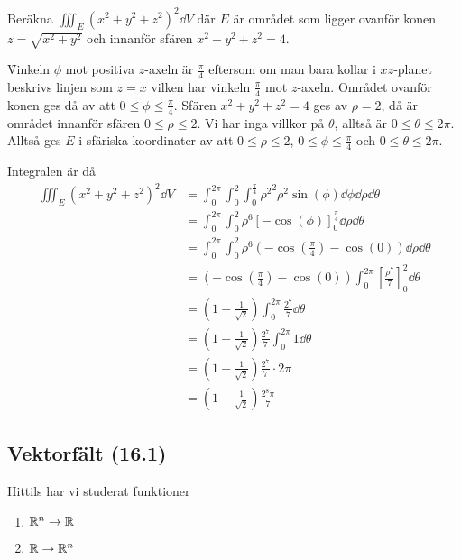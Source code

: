 \documentclass[a4paper]{article}
\begin{document}
\begin{ex}
    Beräkna \(
        \iiint_E {(x^2+y^2+z^2)}^2 \dd V
    \) där \(
        E
    \) är området som ligger ovanför konen \(
        z = \sqrt{x^2+y^2}
    \) och innanför sfären \(
        x^2+y^2+z^2 = 4
    \).

    \f

    Vinkeln \(
        \phi
    \) mot positiva \(
        z
    \)-axeln är \(
        \frac{\pi}{4} 
    \) eftersom om man bara kollar i \(
        xz
    \)-planet beskrivs linjen som \(
        z = x
    \) vilken har vinkeln \(
        \frac{\pi}{4} 
    \) mot \(
        z
    \)-axeln. Området ovanför konen ges då av att \(
        0 \leq \phi \leq \frac{\pi}{4} 
    \). Sfären \(
        x^2+y^2+z^2 = 4
    \) ges av \(
        \rho = 2
    \), då är området innanför sfären \(
        0 \leq \rho \leq 2
    \). Vi har inga villkor på \(
        \theta
    \), alltså är \(
        0 \leq \theta \leq 2\pi
    \). Alltså ges \(
        E
    \) i sfäriska koordinater av att \(
        0 \leq \rho \leq 2
    \), \(
        0 \leq \phi \leq \frac{\pi}{4} 
    \) och \(
        0 \leq \theta \leq 2\pi
    \). 

    Integralen är då 
    \begin{align*}
        \iiint_E {(x^2+y^2+z^2)}^2 \dd V &= \int_0^{2\pi} \int_0^2 \int_0^{\frac{\pi}{4}} {\rho^2}^2 \rho^2 \sin(\phi) \dd \phi \dd \rho \dd \theta \\
            &= \int_0^{2\pi} \int_0^2 \rho^6 \left[ -\cos(\phi) \right]_0^{\frac{\pi}{4}}  \dd \rho \dd \theta \\
            &= \int_0^{2\pi} \int_0^2 \rho^6 (- \cos(\frac{\pi}{4}) - \cos(0)) \dd \rho \dd \theta \\
            &= (- \cos(\frac{\pi}{4}) - \cos(0)) \int_0^{2\pi} \left[ \frac{\rho^7}{7} \right]_0^2 \dd \theta \\
            &= (1 - \frac{1}{\sqrt{2}} ) \int_0^{2\pi} \frac{2^7}{7}  \dd \theta \\
            &= (1 - \frac{1}{\sqrt{2}} )  \frac{2^7}{7} \int_0^{2\pi} 1 \dd \theta \\
            &= (1 - \frac{1}{\sqrt{2}} )  \frac{2^7}{7} \cdot 2\pi \\
            &= (1 - \frac{1}{\sqrt{2}} ) \frac{2^8 \pi}{7} 
    \end{align*}
\end{ex}

\subsection{Vektorfält (16.1)}
Hittils har vi studerat funktioner 
\begin{enumerate}
    \item \(
        \mathbb{R}^n \to \mathbb{R}
    \) 

    \item \(
        \mathbb{R} \to \mathbb{R}^n
    \) 
\end{enumerate}
\end{document}

